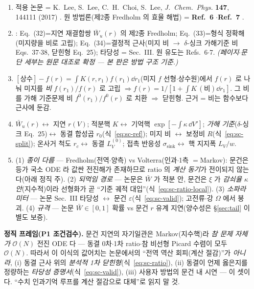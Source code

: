 \begin{enumerate}
\item[\textbf{①\ 서지.}] 적용 논문 = K.~Lee, S.~Lee, C.~H.~Choi, S.~Lee, \emph{J.\ Chem.\ Phys.} \textbf{147}, 144111 (2017)
  \cite{lee2017jcp}. 원 방법론(제2종 Fredholm 의 효율 해법) = \textbf{Ref.~6} \cite{lee2011jcp}$\cdot$\textbf{Ref.~7} \cite{son2013jcp}.
\item[\textbf{②\ 논문 내 사용 위치.}] \cite{lee2017jcp}: Eq.~(32)=지연 재결합쌍 $\bar W_u(r)$ 의 제2종 Fredholm; Eq.~(33)=형식
  정확해(미지량을 비로 고립); Eq.~(34)=결정적 근사(미지 비 $\to$ $\delta$-싱크 가해기준 비 Eqs.~37$\cdot$38, 닫힌형
  Eq.~25); 타당성 = Sec.~III. 원 유도는 Refs.~6$\cdot$7. \emph{(페이지$\cdot$문단 세부는 원문 대조로 확정 --- 본 판은 방법
  구조 기준.)}
\item[\textbf{③\ 원 방법론 수학 구조.}] $[\text{상수}]-f(r)=\int K(r,r_1)f(r_1)\dd r_1$(미지 $f$ 선형$\cdot$상수원)에서
  $f(r)$ 로 나눠 미지를 \emph{비} $f(r_1)/f(r)$ 로 고립 $\Rightarrow f(r)=1/[1+\int K\,(\text{비})\dd r_1]$. 그 비를 가해
  기준문제 비 $f^0(r_1)/f^0(r)$ 로 치환 $\Rightarrow$ 닫힌형. 근거 = 비는 함수보다 근사에 둔감.
\item[\textbf{④\ 변수 매핑(graphite lag).}] $\bar W_u(r)\leftrightarrow$ 지연 $r(V)$; 적분핵 $K\leftrightarrow$ 기억핵
  $\exp[-\int\kappa\,\dd V']$; \emph{가해 기준}($\delta$-싱크 Eq.~25)$\leftrightarrow$ 동결 합성곱 $r_0$(식~\eqref{eq:sc-ref});
  미지 비 $\leftrightarrow$ 보정비 $R$(식~\eqref{eq:sc-split}); 온사거 척도 $r_c\leftrightarrow$ 동결 $L_V^{(0)}$; 접촉 반응성
  $\sigma_{\text{sink}}\leftrightarrow$ 핵 지지폭 $L_V/w$.
\item[\textbf{⑤\ 물리 가정 차(그대로 이식 금지).}] (1) \emph{종이 다름} --- Fredholm(전역$\cdot$양측) vs Volterra(인과$\cdot$1측
  $=$Markov): 문건은 등가 국소 ODE 라 값싼 전진해가 존재하므로 ratio 의 \emph{계산 동기}가 전이되지 않는다(아래 정직 주). (2)
  \emph{되먹임 경로} --- 논문은 $\bar W$ 가 적분 안, 문건은 $\xi$ 가 \emph{감쇠율 $\kappa$ 안}(지수적)이라 선형화가 곧
  ``기준 궤적 대입''(식~\eqref{eq:sc-ratio-local}). (3) \emph{소파라미터} --- 논문 Sec.~III 타당성 $\leftrightarrow$ 문건
  $\varepsilon$(식~\eqref{eq:sc-valid}); 고전류$\cdot$강 $\Omega$ 에서 붕괴. (4) \emph{규격} --- 논문 $\bar W\in[0,1]$ 확률 vs
  문건 $r$ 유계 지연(양수성은 \S\ref{sec:tail} 이 별도 보증).
\end{enumerate}

\begin{keybox}
\textbf{정직 프레임(P1 조건검수).} 문건 지연의 자기일관은 Markov(지수핵)라 \emph{참 문제 자체가} $\mathcal O(N)$ 전진 ODE 다
--- 동결 0차$\cdot$1차 ratio$\cdot$참 비선형 Picard 수렴이 모두 $\mathcal O(N)$. 따라서 이 이식의 값어치는 논문에서의
``전역 역산 회피(계산 절감)''가 \emph{아니라}, (i) 동결 근사 위의 \emph{분석적 1차 닫힌형}(식~\eqref{eq:sc-ratio}),
(ii) 동결이 언제 옳은지를 정량하는 \emph{타당성 증명서}(식~\eqref{eq:sc-valid}), (iii) 사용자 방법의 문건 내 시연 ---
이 셋이다. ``수치 인과기억 루프를 계산 절감으로 대체''로 읽지 말 것.
\end{keybox}


